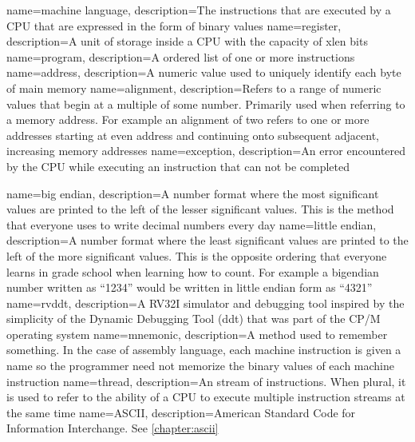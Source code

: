 {
	name={machine language},
	description={The instructions that are executed by a CPU that are expressed
		in the form of \gls{binary} values}
}
{
	name={register},
	description={A unit of storage inside a CPU with the capacity of \gls{xlen} \gls{bit}s}
}
{
	name={program},
	description={A ordered list of one or more instructions}
}
{
	name={address},
	description={A numeric value used to uniquely identify each \gls{byte} of main memory}
}
{
	name={alignment},
	description={Refers to a range of numeric values that begin 
		at a multiple of some number.  Primarily used when referring to
		a memory address.  For example an alignment of two refers to one
		or more addresses starting at even address and continuing onto
		subsequent adjacent, increasing memory addresses}
}
{
	name={exception},
	description={An error encountered by the CPU while executing an instruction
		that can not be completed}
}

{
	name={big endian},
	description={A number format where the most significant values are 
	printed to the left of the lesser significant values.  This is the
	method that everyone uses to write decimal numbers every day}
}
{
	name={little endian},
	description={A number format where the least significant values are 
		printed to the left of the more significant values.  This is the
		opposite ordering that everyone learns in grade school when learning
		how to count.  For example a \gls{bigendian} number written as ``1234''
		would be written in little endian form as ``4321''}
}
{
	name={rvddt},
	description={A RV32I simulator and debugging tool inspired by the 
		simplicity of the Dynamic Debugging Tool (ddt) that was part of 
		the CP/M operating system}
}
{
	name={mnemonic},
	description={A method used to remember something.  In the case of
		assembly language, each machine instruction is given a name
		so the programmer need not memorize the binary values of each
		machine instruction}
}
{
	name={thread},
	description={An stream of instructions.  When plural, it is
		used to refer to the ability of a CPU to execute multiple 
		instruction streams at the same time}
}
{
	name={ASCII},
	description={American Standard Code for Information Interchange.
		See \autoref{chapter:ascii}}
}


